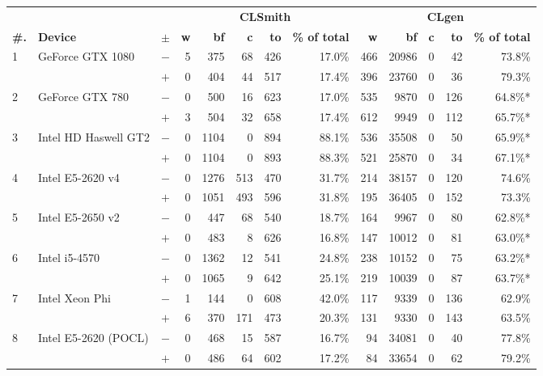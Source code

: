   \begin{tabular}{lll | rrrrr | rrrrr }
  \toprule
  & & & \multicolumn{5}{c|}{\textbf{CLSmith}} & \multicolumn{5}{c}{\textbf{CLgen}} \\
  \textbf{\#.} & \textbf{Device} & $\pm$ &
  \textbf{w} & \textbf{bf} & \textbf{c} & \textbf{to} & \textbf{\% of total} &
  \textbf{w} & \textbf{bf} & \textbf{c} & \textbf{to} & \textbf{\% of total} \\
  \midrule
  \multirow{ 2}{*}{1} & \multirow{ 2}{*}{GeForce GTX 1080} & $-$ & 5 & 375 & 68 & 426 & 17.0\%       & 466 & 20986 & 0 & 42 & 73.8\% \\& & $+$ & 0 & 404 & 44 & 517 & 17.4\% & 396 & 23760 & 0 & 36 & 79.3\% \\
\hline
\multirow{ 2}{*}{2} & \multirow{ 2}{*}{GeForce GTX 780} & $-$ & 0 & 500 & 16 & 623 & 17.0\%       & 535 & 9870 & 0 & 126 & 64.8\%* \\& & $+$ & 3 & 504 & 32 & 658 & 17.4\% & 612 & 9949 & 0 & 112 & 65.7\%* \\
\hline
\multirow{ 2}{*}{3} & \multirow{ 2}{*}{Intel HD Haswell GT2} & $-$ & 0 & 1104 & 0 & 894 & 88.1\%       & 536 & 35508 & 0 & 50 & 65.9\%* \\& & $+$ & 0 & 1104 & 0 & 893 & 88.3\% & 521 & 25870 & 0 & 34 & 67.1\%* \\
\hline
\multirow{ 2}{*}{4} & \multirow{ 2}{*}{Intel E5-2620 v4} & $-$ & 0 & 1276 & 513 & 470 & 31.7\%       & 214 & 38157 & 0 & 120 & 74.6\% \\& & $+$ & 0 & 1051 & 493 & 596 & 31.8\% & 195 & 36405 & 0 & 152 & 73.3\% \\
\hline
\multirow{ 2}{*}{5} & \multirow{ 2}{*}{Intel E5-2650 v2} & $-$ & 0 & 447 & 68 & 540 & 18.7\%       & 164 & 9967 & 0 & 80 & 62.8\%* \\& & $+$ & 0 & 483 & 8 & 626 & 16.8\% & 147 & 10012 & 0 & 81 & 63.0\%* \\
\hline
\multirow{ 2}{*}{6} & \multirow{ 2}{*}{Intel i5-4570} & $-$ & 0 & 1362 & 12 & 541 & 24.8\%       & 238 & 10152 & 0 & 75 & 63.2\%* \\& & $+$ & 0 & 1065 & 9 & 642 & 25.1\% & 219 & 10039 & 0 & 87 & 63.7\%* \\
\hline
\multirow{ 2}{*}{7} & \multirow{ 2}{*}{Intel Xeon Phi} & $-$ & 1 & 144 & 0 & 608 & 42.0\%       & 117 & 9339 & 0 & 136 & 62.9\% \\& & $+$ & 6 & 370 & 171 & 473 & 20.3\% & 131 & 9330 & 0 & 143 & 63.5\% \\
\hline
\multirow{ 2}{*}{8} & \multirow{ 2}{*}{Intel E5-2620 (POCL)} & $-$ & 0 & 468 & 15 & 587 & 16.7\%       & 94 & 34081 & 0 & 40 & 77.8\% \\& & $+$ & 0 & 486 & 64 & 602 & 17.2\% & 84 & 33654 & 0 & 62 & 79.2\% \\

\end{tabular}
